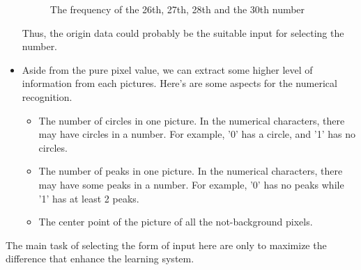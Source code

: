 \documentclass[12pt]{article} %
\begin{document}
\begin{itemize}
\begin{figure}[!htb]
        \caption{The frequency of the 26th, 27th, 28th and the 30th number}
        \label{The frequency of the 26th, 27th, 28th and the 30th number}
    \end{figure}
    Thus, the origin data could probably be the suitable input for selecting the number.
\item[\textbullet] Aside from the pure pixel value, we can extract some higher level of information from each pictures. Here's are some aspects for the numerical recognition.
    \begin{itemize}
        \item The number of circles in one picture. In the numerical characters, there may have circles in a number. For example, '0' has a circle, and '1' has no circles. 
        \item The number of peaks in one picture. In the numerical characters, there may have some peaks in a number. For example, '0' has no peaks while '1' has at least 2 peaks.
        \item The center point of the picture of all the not-background pixels.
    \end{itemize}
\end{itemize}
The main task of selecting the form of input here are only to maximize the difference that enhance the learning system. 
\end{document}
